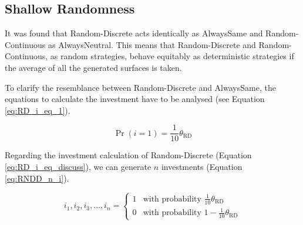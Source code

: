 \documentclass[11pt]{article}
\begin{document}
\subsection{Shallow Randomness} \label{sec:shallow_randomness}

	It was found that Random-Discrete acts identically as AlwaysSame and Random-Continuous as AlwaysNeutral.
	This means that Random-Discrete and Random-Continuous, as random strategies, behave equitably as deterministic strategies if the average of all the generated surfaces is taken.
		
	To clarify the resemblance between Random-Discrete and AlwaysSame, the equations to calculate the investment have to be analysed (see Equation \ref{eq:RD_i_eq_1}).


	\begin{equation}
		\Pr(i = 1) = \frac{1}{10} \theta_{\mathrm{RD}}
		\label{eq:RD_i_eq_discuss}
	\end{equation}


	\noindent
	Regarding the investment calculation of Random-Discrete (Equation \ref{eq:RD_i_eq_discuss}), we can generate $n$ investments (Equation \ref{eq:RNDD_n_i}).

	\begin{equation}
		i_1, i_2, i_3, \dots, i_n = 
		\begin{cases}
		1 & \text{with probability } \frac{1}{10} \theta_{\mathrm{RD}}\\
		0 & \text{with probability } 1 - \frac{1}{10} \theta_{\mathrm{RD}} 
		\end{cases}
		\label{eq:RD_n_i}
	\end{equation}
\end{document}
